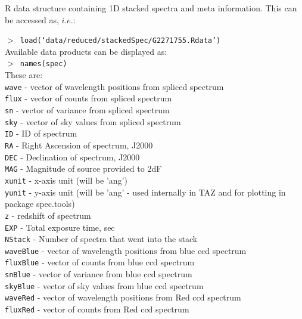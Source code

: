 \documentclass[12pt]{article}
\begin{document}
  R data structure containing 1D stacked spectra and meta information. This can be accessed as, $i.e.$:
  
  \hspace{10mm}  \texttt{$>$ load(`data/reduced/stackedSpec/G2271755.Rdata')}\\

Available data products can be displayed as:\\

\hspace{10mm}  \texttt{$>$ names(spec)}\\  

These are: \\

\texttt{wave} - vector of wavelength positions from spliced spectrum \\
\texttt{flux} - vector of counts from spliced spectrum \\
\texttt{sn} - vector of variance from spliced spectrum \\
\texttt{sky} - vector of sky values from spliced spectrum \\
\texttt{ID} - ID of spectrum \\
\texttt{RA} - Right Ascension of spectrum, J2000 \\
\texttt{DEC} - Declination of spectrum, J2000 \\ 
\texttt{MAG} - Magnitude of source provided to 2dF \\
\texttt{xunit} - x-axis unit (will be 'ang') \\
\texttt{yunit} - y-axis unit (will be 'ang' - used internally in TAZ and for plotting in package spec.tools) \\
\texttt{z} - redshift of spectrum  \\
\texttt{EXP} - Total exposure time, sec \\
\texttt{NStack} - Number of spectra that went into the stack\\
\texttt{waveBlue} - vector of wavelength positions from blue ccd spectrum\\
\texttt{fluxBlue} - vector of counts from blue ccd spectrum\\
\texttt{snBlue} - vector of variance from blue ccd spectrum\\
\texttt{skyBlue} - vector of sky values from blue ccd spectrum\\
\texttt{waveRed} - vector of wavelength positions from Red ccd spectrum\\
\texttt{fluxRed} - vector of counts from Red ccd spectrum\\
\end{document}
